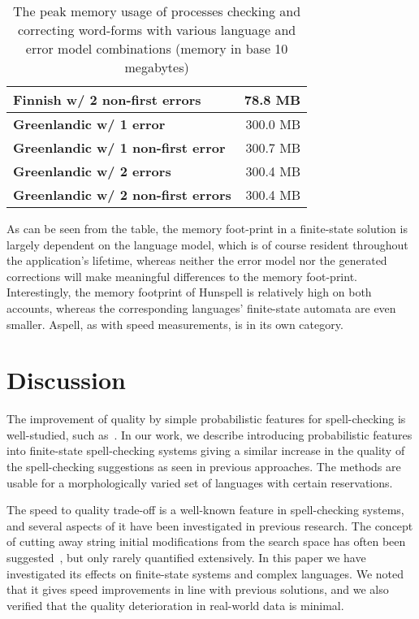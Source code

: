 \documentclass[a4paper,12pt]{article}
\begin{document}
\begin{table}
\begin{tabular}{|l|r|}
\bf Finnish w/ 2 non-first errors & 78.8 MB \\
        \hline
        \bf Greenlandic w/ 1 error & 300.0 MB \\
\bf Greenlandic w/ 1 non-first error & 300.7 MB \\
       \bf Greenlandic w/ 2 errors & 300.4 MB \\
\bf Greenlandic w/ 2 non-first errors & 300.4 MB \\
        \hline
    \end{tabular}
    \caption{The peak memory usage of processes checking and correcting
        word-forms with various language and error model combinations
        (memory in base 10 megabytes) \label{table:memory}}
\end{table}

As can be seen from the table, the memory foot-print in a finite-state
solution is largely dependent on the language model, which is of course
resident throughout the application's lifetime, whereas neither the error model
nor the generated corrections will make meaningful differences to the memory
foot-print. Interestingly, the memory footprint of Hunspell is relatively
high on both accounts, whereas the corresponding languages' finite-state
automata are even smaller. Aspell, as with speed measurements, is in its own
category.

\section{Discussion}
\label{sec:discussion}

The improvement of quality by simple probabilistic features for spell-checking
is well-studied, such as~\cite{church1991probability}. In our work, we
describe introducing probabilistic features into finite-state spell-checking
systems giving a similar increase in the quality of the spell-checking
suggestions as seen in previous approaches. The methods are usable for
a morphologically varied set of languages with certain reservations.

The speed to quality trade-off is a well-known feature in spell-checking
systems, and several aspects of it have been investigated in previous research.
The concept of cutting away string initial modifications from the search space
has often been suggested~\cite[]{kukich1992techniques,bhagat2007spelling}, but
only rarely quantified extensively. In this paper we have investigated its
effects on finite-state systems and complex languages. We noted that it gives
speed improvements in line with previous solutions, and we
also verified that the quality deterioration in real-world data is minimal.
\end{document}
